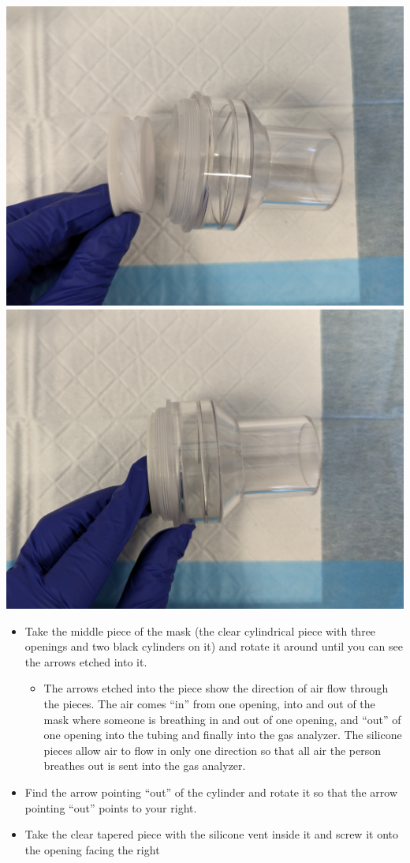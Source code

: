 \documentclass[
]{book}
\providecommand{\tightlist}{%
  \setlength{\itemsep}{0pt}\setlength{\parskip}{0pt}}
\begin{document}
\includegraphics[width=0.5\linewidth]{images/maskassembly/04_show_direction}
\includegraphics[width=0.5\linewidth]{images/maskassembly/04_show_placement}

\begin{itemize}
\tightlist
\item
  Take the middle piece of the mask (the clear cylindrical piece with three openings and two black cylinders on it) and rotate it around until you can see the arrows etched into it.

  \begin{itemize}
  \tightlist
  \item
    The arrows etched into the piece show the direction of air flow through the pieces. The air comes ``in'' from one opening, into and out of the mask where someone is breathing in and out of one opening, and ``out'' of one opening into the tubing and finally into the gas analyzer. The silicone pieces allow air to flow in only one direction so that all air the person breathes out is sent into the gas analyzer.
  \end{itemize}
\item
  Find the arrow pointing ``out'' of the cylinder and rotate it so that the arrow pointing ``out'' points to your right.
\item
  Take the clear tapered piece with the silicone vent inside it and screw it onto the opening facing the right
\end{itemize}
\end{document}
